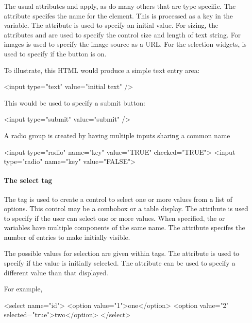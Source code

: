 The usual attributes  and 
apply, as do many others that are type specific.
The  attribute specifes the name for the
element. This is processed as a key in the  variable. The
 attribute is used to specify an initial value. For sizing, the
attributes  and  are used to
specify the control size and length of text string. For images
 is used to specify the image source as a URL. For
the selection widgets,  is used to specify if the
button is on. 

To illustrate, this HTML would produce a simple text entry area:
\begin{HTMLinput}
<input type="text" value="initial text" />
\end{HTMLinput}
This would be used to specify a submit button:
\begin{HTMLinput}
<input type="submit" value="submit" />
\end{HTMLinput}

A radio group is created by having multiple inputs sharing a common name
\begin{HTMLinput}
<input type="radio" name="key" value="TRUE" checked="TRUE">
<input type="radio" name="key" value="FALSE">
\end{HTMLinput}


\paragraph{The select tag}
The  tag is used to create a control to select one or more
values from a list of options. This control may be a combobox or a
table display. The attribute
 is used to specify if the user can select
one or more values. When specified, the  or  variables
have multiple components of the same name. The 
attribute specifes the number of entries to make initially visible. 

The possible values for selection are given within 
tags. The attribute  is used to specify if
the value is initially selected. The attribute
 can be used to specify a different value than
that displayed.

For example, 
\begin{HTMLinput}
<select name="id">
  <option value="1">one</option>
  <option value="2" selected="true">two</option>
</select>
\end{HTMLinput}

